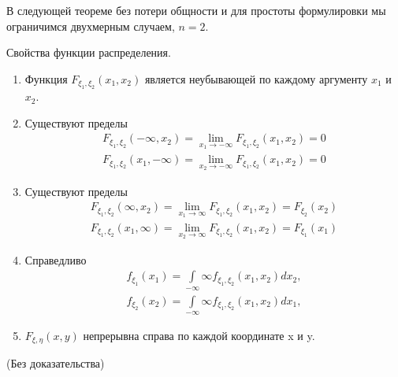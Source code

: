 В следующей теореме без потери общности и для простоты формулировки мы ограничимся двухмерным случаем, $n = 2$.

\begin{theorem}
Свойства функции распределения.
\label{t:15.7}
\begin{enumerate}
	\item Функция $F_{\xi_1,\xi_2}(x_1,x_2)$ является неубывающей по каждому аргументу $x_1$ и $x_2$.

	\item Существуют пределы 
	\begin{gather*}
	F_{\xi_1,\xi_2}(-\infty,x_2)=\lim\limits_{x_1\to-\infty}
	F_{\xi_1,\xi_2}(x_1,x_2)=0 \\
	F_{\xi_1,\xi_2}(x_1,-\infty)=\lim\limits_{x_2\to-\infty}
	F_{\xi_1,\xi_2}(x_1,x_2)=0
	\end{gather*}

	\item Существуют пределы 
	\begin{gather*}
	F_{\xi_1,\xi_2}(\infty,x_2)=\lim\limits_{x_1\to\infty}
	F_{\xi_1,\xi_2}(x_1,x_2)=F_{\xi_2}(x_2) \\
	F_{\xi_1,\xi_2}(x_1,\infty)=\lim\limits_{x_2\to\infty}
	F_{\xi_1,\xi_2}(x_1,x_2)=F_{\xi_1}(x_1)
	\end{gather*}

	\item Справедливо
	\begin{gather*}
	f_{\xi_1}(x_1)=\int\limits_{-\infty}{\infty}f_{\xi_1,\xi_2}(x_1,x_2)dx_2, \\
	f_{\xi_2}(x_2)=\int\limits_{-\infty}{\infty}f_{\xi_1,\xi_2}(x_1,x_2)dx_1,
	\end{gather*}

	\item $F_{\xi,\eta}(x, y)$ непрерывна справа по каждой координате x и y.



\end{enumerate}
(Без доказательства)
\end{theorem}

